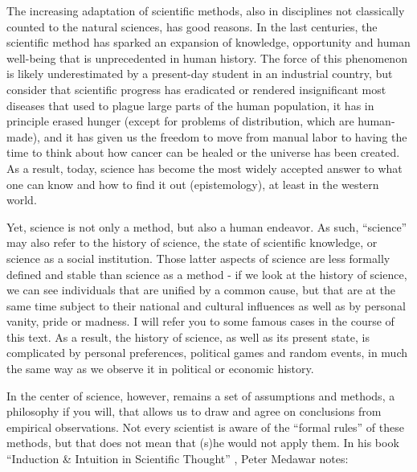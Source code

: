 \documentclass{tufte-book}
\begin{document}
The increasing adaptation of scientific methods, also in disciplines not classically counted to the natural sciences, has good reasons. In the last centuries, the scientific method has sparked an expansion of knowledge, opportunity and human well-being that is unprecedented in human history. The force of this phenomenon is likely underestimated by a present-day student in an industrial country, but consider that scientific progress has eradicated or rendered insignificant most diseases that used to plague large parts of the human population, it has in principle erased hunger (except for problems of distribution, which are human-made), and it has given us the freedom to move from manual labor to having the time to think about how cancer can be healed or the universe has been created. As a result, today, science has become the most widely accepted answer to what one can know and how to find it out (epistemology), at least in the western world. 

Yet, science is not only a method, but also a human endeavor. As such, ``science'' may also refer to the history of science, the state of scientific knowledge, or science as a social institution. Those latter aspects of science are less formally defined and stable than science as a method - if we look at the history of science, we can see individuals that are unified by a common cause, but that are at the same time subject to their national and cultural influences as well as by personal vanity, pride or madness. I will refer you to some famous cases in the course of this text. As a result, the history of science, as well as its present state, is complicated by personal preferences, political games and random events, in much the same way as we observe it in political or economic history. 

In the center of science, however, remains a set of assumptions and methods, a philosophy if you will, that allows us to draw and agree on conclusions from empirical observations. Not every scientist is aware of the ``formal rules'' of these methods, but that does not mean that (s)he would not apply them. In his book ``Induction \& Intuition in Scientific Thought'' \citep{Medawar-Inductionintuitionscientific-2013}, Peter Medawar notes: 
\end{document}
